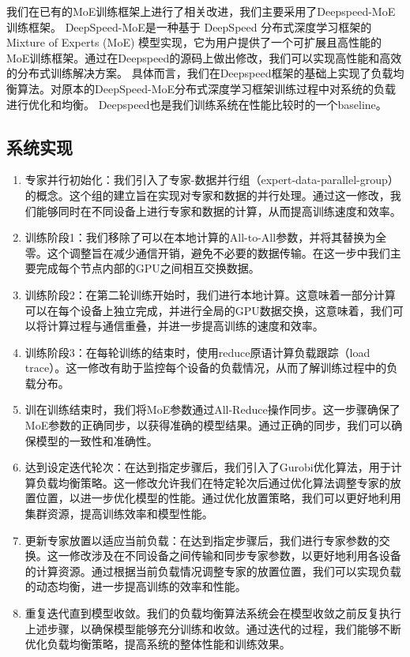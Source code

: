 我们在已有的MoE训练框架上进行了相关改进，我们主要采用了Deepspeed-MoE训练框架。
% 
DeepSpeed-MoE是一种基于 DeepSpeed 分布式深度学习框架的 Mixture of Experts (MoE) 模型实现，它为用户提供了一个可扩展且高性能的MoE训练框架。通过在Deepspeed的源码上做出修改，我们可以实现高性能和高效的分布式训练解决方案。
% 
具体而言，我们在Deepspeed框架的基础上实现了负载均衡算法。对原本的DeepSpeed-MoE分布式深度学习框架训练过程中对系统的负载进行优化和均衡。
% 
Deepspeed也是我们训练系统在性能比较时的一个baseline。


\subsection{系统实现}

\begin{enumerate}
    \item 专家并行初始化：我们引入了专家-数据并行组（expert-data-parallel-group）的概念。这个组的建立旨在实现对专家和数据的并行处理。通过这一修改，我们能够同时在不同设备上进行专家和数据的计算，从而提高训练速度和效率。
    \item 训练阶段1：我们移除了可以在本地计算的All-to-All参数，并将其替换为全零。这个调整旨在减少通信开销，避免不必要的数据传输。在这一步中我们主要完成每个节点内部的GPU之间相互交换数据。
    \item 训练阶段2：在第二轮训练开始时，我们进行本地计算。这意味着一部分计算可以在每个设备上独立完成，并进行全局的GPU数据交换，这意味着，我们可以将计算过程与通信重叠，并进一步提高训练的速度和效率。
    \item 训练阶段3：在每轮训练的结束时，使用reduce原语计算负载跟踪（load trace）。这一修改有助于监控每个设备的负载情况，从而了解训练过程中的负载分布。
    \item 训在训练结束时，我们将MoE参数通过All-Reduce操作同步。这一步骤确保了MoE参数的正确同步，以获得准确的模型结果。通过正确的同步，我们可以确保模型的一致性和准确性。
    \item 达到设定迭代轮次：在达到指定步骤后，我们引入了Gurobi优化算法，用于计算负载均衡策略。这一修改允许我们在特定轮次后通过优化算法调整专家的放置位置，以进一步优化模型的性能。通过优化放置策略，我们可以更好地利用集群资源，提高训练效率和模型性能。
    \item 更新专家放置以适应当前负载：在达到指定步骤后，我们进行专家参数的交换。这一修改涉及在不同设备之间传输和同步专家参数，以更好地利用各设备的计算资源。通过根据当前负载情况调整专家的放置位置，我们可以实现负载的动态均衡，进一步提高训练的效率和性能。
    \item 重复迭代直到模型收敛。我们的负载均衡算法系统会在模型收敛之前反复执行上述步骤，以确保模型能够充分训练和收敛。通过迭代的过程，我们能够不断优化负载均衡策略，提高系统的整体性能和训练效果。

\end{enumerate}

